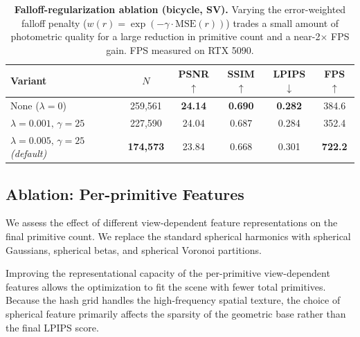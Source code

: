 \documentclass[acmtog,anonymous,review]{acmart}
\newcommand{\first}[1]{\cellcolor{red!25}\textbf{#1}}
\begin{document}
\begin{table}[h]
\centering
\small
\caption{\textbf{Falloff-regularization ablation (bicycle, SV).}
Varying the error-weighted falloff penalty
($w(r) = \exp(-\gamma \cdot \mathrm{MSE}(r))$) trades a small amount of
photometric quality for a large reduction in primitive count and a near-2$\times$
FPS gain. FPS measured on RTX 5090.}
\label{tab:ablation_falloff}
\begin{tabular}{l|ccccc}
\toprule
\textbf{Variant} & $N$ & PSNR$\uparrow$ & SSIM$\uparrow$ & LPIPS$\downarrow$ & FPS$\uparrow$ \\
\midrule
None ($\lambda=0$)                            & 259,561        & \first{24.14} & \first{0.690} & \first{0.282} & 384.6 \\
$\lambda=0.001,\, \gamma=25$                  & 227,590        & 24.04         & 0.687         & 0.284         & 352.4 \\
$\lambda=0.005,\, \gamma=25$ \emph{(default)} & \first{174,573}& 23.84         & 0.668         & 0.301         & \first{722.2} \\
\bottomrule
\end{tabular}
\end{table}

\subsection{Ablation: Per-primitive Features}
We assess the effect of different view-dependent feature representations on the final primitive count. We replace the standard spherical harmonics with spherical Gaussians, spherical betas, and spherical Voronoi partitions.

Improving the representational capacity of the per-primitive view-dependent features allows the optimization to fit the scene with fewer total primitives. Because the hash grid handles the high-frequency spatial texture, the choice of spherical feature primarily affects the sparsity of the geometric base rather than the final LPIPS score.
\end{document}
